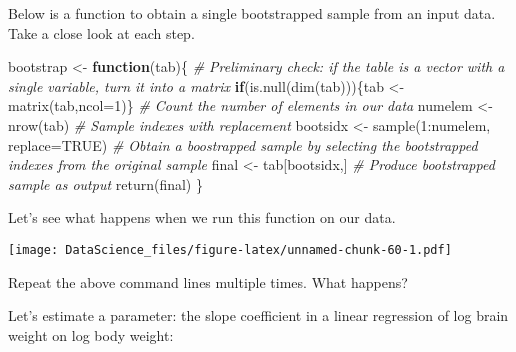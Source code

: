 \documentclass[
]{book}
\newenvironment{Shaded}{\begin{snugshade}}{\end{snugshade}}
\newcommand{\AttributeTok}[1]{\textcolor[rgb]{0.77,0.63,0.00}{#1}}
\newcommand{\CommentTok}[1]{\textcolor[rgb]{0.56,0.35,0.01}{\textit{#1}}}
\newcommand{\ConstantTok}[1]{\textcolor[rgb]{0.00,0.00,0.00}{#1}}
\newcommand{\ControlFlowTok}[1]{\textcolor[rgb]{0.13,0.29,0.53}{\textbf{#1}}}
\newcommand{\DecValTok}[1]{\textcolor[rgb]{0.00,0.00,0.81}{#1}}
\newcommand{\FunctionTok}[1]{\textcolor[rgb]{0.00,0.00,0.00}{#1}}
\newcommand{\NormalTok}[1]{#1}
\newcommand{\OtherTok}[1]{\textcolor[rgb]{0.56,0.35,0.01}{#1}}
\newcommand{\SpecialCharTok}[1]{\textcolor[rgb]{0.00,0.00,0.00}{#1}}
\begin{document}
Below is a function to obtain a single bootstrapped sample from an input data. Take a close look at each step.

\begin{Shaded}
\begin{Highlighting}[]
\NormalTok{bootstrap }\OtherTok{\textless{}{-}} \ControlFlowTok{function}\NormalTok{(tab)\{}
  \CommentTok{\# Preliminary check: if the table is a vector with a single variable, turn it into a matrix}
  \ControlFlowTok{if}\NormalTok{(}\FunctionTok{is.null}\NormalTok{(}\FunctionTok{dim}\NormalTok{(tab)))\{tab }\OtherTok{\textless{}{-}} \FunctionTok{matrix}\NormalTok{(tab,}\AttributeTok{ncol=}\DecValTok{1}\NormalTok{)\}}
  \CommentTok{\# Count the number of elements in our data}
\NormalTok{  numelem }\OtherTok{\textless{}{-}} \FunctionTok{nrow}\NormalTok{(tab)}
  \CommentTok{\# Sample indexes with replacement}
\NormalTok{  bootsidx }\OtherTok{\textless{}{-}} \FunctionTok{sample}\NormalTok{(}\DecValTok{1}\SpecialCharTok{:}\NormalTok{numelem, }\AttributeTok{replace=}\ConstantTok{TRUE}\NormalTok{)}
  \CommentTok{\# Obtain a boostrapped sample by selecting the bootstrapped indexes from the original sample}
\NormalTok{  final }\OtherTok{\textless{}{-}}\NormalTok{ tab[bootsidx,]}
  \CommentTok{\# Produce bootstrapped sample as output}
  \FunctionTok{return}\NormalTok{(final)}
\NormalTok{\}}
\end{Highlighting}
\end{Shaded}

Let's see what happens when we run this function on our data.

\begin{Shaded}
\end{Shaded}

\texttt{[image: DataScience\_files/figure-latex/unnamed-chunk-60-1.pdf]}

Repeat the above command lines multiple times. What happens?

Let's estimate a parameter: the slope coefficient in a linear regression of log brain weight on log body weight:

\begin{Shaded}
\end{Shaded}
\end{document}
